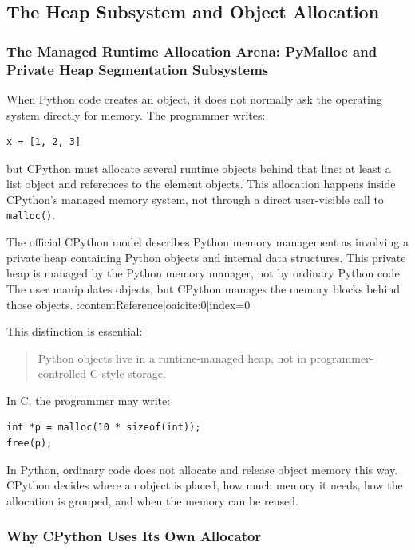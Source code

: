 \subsection{The Heap Subsystem and Object Allocation}

\subsubsection{The Managed Runtime Allocation Arena: PyMalloc and Private Heap Segmentation Subsystems}

When Python code creates an object, it does not normally ask the operating system directly for memory. The programmer writes:

\begin{verbatim}
x = [1, 2, 3]
\end{verbatim}

but CPython must allocate several runtime objects behind that line: at least a list object and references to the element objects. This allocation happens inside CPython's managed memory system, not through a direct user-visible call to \texttt{malloc()}.

The official CPython model describes Python memory management as involving a private heap containing Python objects and internal data structures. This private heap is managed by the Python memory manager, not by ordinary Python code. The user manipulates objects, but CPython manages the memory blocks behind those objects. :contentReference[oaicite:0]{index=0}

This distinction is essential:

\begin{quote}
Python objects live in a runtime-managed heap, not in programmer-controlled C-style storage.
\end{quote}

In C, the programmer may write:

\begin{verbatim}
int *p = malloc(10 * sizeof(int));
free(p);
\end{verbatim}

In Python, ordinary code does not allocate and release object memory this way. CPython decides where an object is placed, how much memory it needs, how the allocation is grouped, and when the memory can be reused.

\subsubsection*{Why CPython Uses Its Own Allocator}


